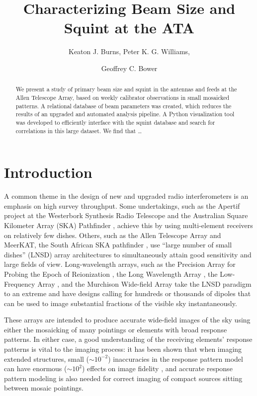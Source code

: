 \documentclass[preprint]{aastex}
\begin{document}
\title{Characterizing Beam Size and Squint at the ATA}
\author{Keaton J. Burns, Peter K. G. Williams, \and Geoffrey C. Bower}

\begin{abstract}
We present a study of primary beam size and squint in the antennas and
feeds at the Allen Telescope Array, based on weekly calibrator
observations in small mosaicked patterns. A relational database of
beam parameters was created, which reduces the results of an upgraded
and automated analysis pipeline.  A Python visualization tool was
developed to efficiently interface with the squint database and search
for correlations in this large dataset.  We find that \ldots
\end{abstract}


\section{Introduction}\label{s.intro}

A common theme in the design of new and upgraded radio interferometers
is an emphasis on high survey throughput. Some undertakings, such as
the Apertif project at the Westerbork Synthesis Radio Telescope
\citep{theapertif} and the Australian Square Kilometer Array (SKA)
Pathfinder \citep[ASKAP;][]{theaskap}, achieve this by using
multi-element receivers on relatively few dishes. Others, such as the
Allen Telescope Array \citep[ATA;][]{Welch2009} and MeerKAT, the South
African SKA pathfinder \citep{themeerkat}, use ``large number of small
dishes'' (LNSD) array architectures to simultaneously attain good
sensitivity and large fields of view. Long-wavelength arrays, such as
the Precision Array for Probing the Epoch of Reionization
\citep[PAPER;][]{thepaper}, the Long Wavelength Array
\citep[LWA;][]{thelwa}, the Low-Frequency Array
\citep[LOFAR;][]{thelofar}, and the Murchison Wide-field Array
\citep[MWA;][]{themwa} take the LNSD paradigm to an extreme and have
designs calling for hundreds or thousands of dipoles that can be used
to image substantial fractions of the visible sky instantaneously.

These arrays are intended to produce accurate wide-field images of the
sky using either the mosaicking of many pointings or elements with
broad response patterns. In either case, a good understanding of the
receiving elements' response patterns is vital to the imaging process:
it has been shown that when imaging extended structures, small
($\sim$$10^{-2}$) inaccuracies in the response pattern model can have
enormous ($\sim$$10^2$) effects on image fidelity \citep{chu93,wc08},
and accurate response pattern modeling is also needed for correct
imaging of compact sources sitting between mosaic pointings.
\end{document}
